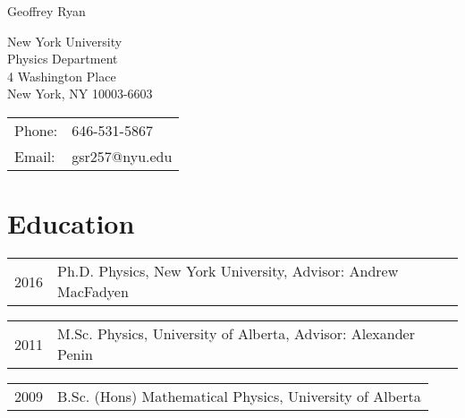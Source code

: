 \documentclass[letterpaper]{article}
\def\name{Geoffrey Ryan}
\renewenvironment{itemize}{
  \begin{list}{}{
    \setlength{\leftmargin}{-0.5em}
  }
}{
  \end{list}
}
\begin{document}
{\huge \name}


\vspace{0.25in}

\begin{minipage}{0.45\linewidth}
  New York University \\
  Physics Department\\
  4 Washington Place\\
  New York, NY 10003-6603
\end{minipage}
\begin{minipage}{0.45\linewidth}
  \begin{tabular}{ll}
    Phone: & 646-531-5867 \\
    Email: &  gsr257@nyu.edu \\
  \end{tabular}
\end{minipage}

\section*{Education}
\begin{itemize}
\item \begin{tabular}{ll}
2016 & Ph.D. Physics, New York University, Advisor: Andrew MacFadyen \\
\end{tabular}

\item \begin{tabular}{ll}
2011 &  M.Sc. Physics, University of Alberta, Advisor: Alexander Penin \\
\end{tabular}

\item \begin{tabular}{ll}
2009 &  B.Sc. (Hons) Mathematical Physics, University of Alberta \\
\end{tabular}
\end{itemize}

\end{document}
